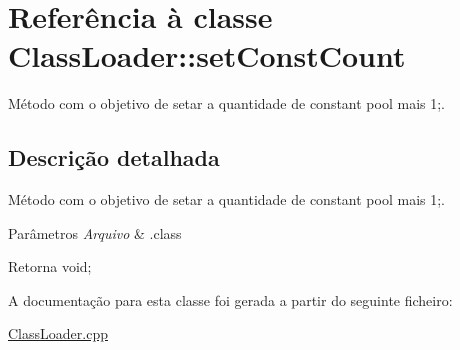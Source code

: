 \hypertarget{class_class_loader_1_1set_const_count}{}\section{Referência à classe Class\+Loader\+:\+:set\+Const\+Count}
\label{class_class_loader_1_1set_const_count}


Método com o objetivo de setar a quantidade de constant pool mais 1;.  




\subsection{Descrição detalhada}
Método com o objetivo de setar a quantidade de constant pool mais 1;. 


\begin{DoxyParams}{Parâmetros}
{\em Arquivo} & .class \\
\hline
\end{DoxyParams}
\begin{DoxyReturn}{Retorna}
void; 
\end{DoxyReturn}


A documentação para esta classe foi gerada a partir do seguinte ficheiro\+:\begin{DoxyCompactItemize}
\item 
\hyperlink{_class_loader_8cpp}{Class\+Loader.\+cpp}\end{DoxyCompactItemize}
